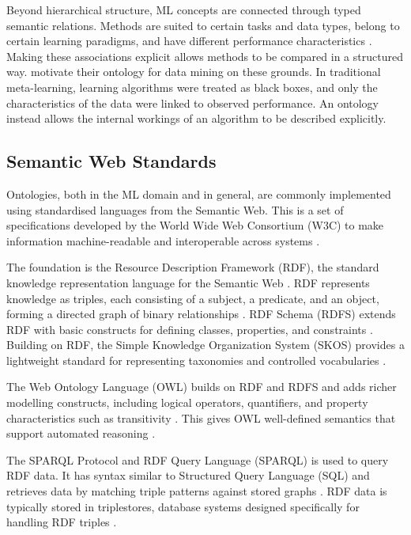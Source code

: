 Beyond hierarchical structure, ML concepts are connected through 
typed semantic relations.
Methods are suited to certain tasks and data types, belong to certain 
learning paradigms, and have different performance characteristics 
\parencite{humm2026industry_ready_machine_learning_ontology}.
Making these associations explicit allows methods to be compared
in a structured way. 
\textcite{keet2015data_mining_optimization_ontology} motivate their
ontology for data mining on these grounds. In traditional
meta-learning, learning algorithms were treated as black boxes, and
only the characteristics of the data were linked to observed
performance. An ontology instead allows the internal workings of an
algorithm to be described explicitly.

\subsection{Semantic Web Standards}
\label{sec:semantic-web-standards}

Ontologies, both in the ML domain and in general, are commonly implemented using
standardised languages from the Semantic Web. This is a set of
specifications developed by the World Wide Web Consortium
(W3C) to make information machine-readable and interoperable
across systems \parencite{w3c}.

The foundation is the Resource Description Framework (RDF),
the standard knowledge representation language for the Semantic
Web \parencite{gibbins2009resource_description_framework_rdf}.
RDF represents knowledge as triples, each consisting of a
subject, a predicate, and an object, forming a directed graph
of binary relationships
\parencite{gibbins2009resource_description_framework_rdf}.
RDF Schema (RDFS) extends RDF with basic constructs for
defining classes, properties, and constraints
\parencite{gibbins2009resource_description_framework_rdf}.
Building on RDF, the Simple Knowledge Organization System (SKOS)
provides a lightweight standard for representing taxonomies
and controlled vocabularies
\parencite{humm2026industry_ready_machine_learning_ontology}.

The Web Ontology Language (OWL) builds on RDF and RDFS and
adds richer modelling constructs, including logical operators,
quantifiers, and property characteristics such as transitivity
\parencite{bechhofer2009owl_web_ontology_language}.
This gives OWL well-defined semantics that support automated
reasoning
\parencite{bechhofer2009owl_web_ontology_language}.

The SPARQL Protocol and RDF Query Language (SPARQL) is used to
query RDF data. It has syntax similar to Structured Query Language (SQL) and retrieves
data by matching triple patterns against stored graphs
\parencite{grobe2009rdf_jena_sparql_semantic_web}.
RDF data is typically stored in triplestores, database systems
designed specifically for handling RDF triples
\parencite{grobe2009rdf_jena_sparql_semantic_web}.

